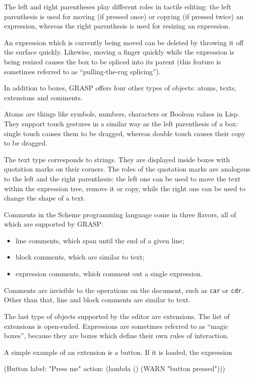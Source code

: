 \documentclass[sigconf]{acmart}
\newenvironment{Snippet}{\Verbatim[samepage=true]}{\endVerbatim}
\begin{document}
The left and right parentheses play different roles in 
tactile editing: the left parenthesis is used for moving
(if pressed once) or copying (if pressed twice) an expression,
whereas the right parenthesis is used for resizing an expression.

An expression which is currently being moved can be deleted
by throwing it off the surface quickly. Likewise, moving
a finger quickly while the expression is being resized
causes the box to be spliced into its parent (this feature
is sometimes referred to as ``pulling-the-rug splicing'').

In addition to boxes, GRASP offers four other types
of objects: atoms, texts, extensions and comments.

Atoms are things like symbols, numbers, characters
or Boolean values in Lisp. They support touch
gestures in a similar way as the left parenthesis
of a box: single touch causes them to be dragged,
whereas double touch causes their copy to be dragged.

The text type corresponds to strings. They are 
displayed inside boxes with quotation marks
on their corners. The roles of the quotation
marks are analogous to the left and the right
parenthesis: the left one can be used to
move the text within the expression tree,
remove it or copy, while the right one can be used
to change the shape of a text.

Comments in the Scheme programming language come in
three flavors, all of which are supported by GRASP:
\begin{itemize}
\item line comments, which span until the end of a given line;
\item block comments, which are similar to text;
\item expression comments, which comment out a single expression.
\end{itemize}

Comments are invisible to the operations
on the document, such as \texttt{car} or \texttt{cdr}. 
Other than that, line and block comments are similar to text.

The last type of objects supported by the editor
are extensions. The list of extensions is open-ended.
Expressions are sometimes referred to as ``magic boxes'',
because they are boxes which define their own rules
of interaction.

A simple example of an extension is a button.
If it is loaded, the expression

\begin{Snippet}
(Button label: "Press me" 
	action: (lambda () (WARN "button pressed")))
\end{Snippet}
\end{document}
